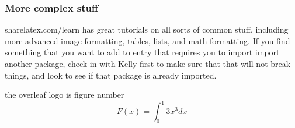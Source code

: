 \documentclass{article}
\begin{document}
\subsubsection{More complex stuff}
sharelatex.com/learn has great tutorials on all sorts of common stuff, including more advanced image formatting, tables, lists, and math formatting. If you find something that you want to add to entry that requires you to import import another package, check in with Kelly first to make sure that that will not break things, and look to see if that package is already imported.

the overleaf logo is figure number $$F(x) = \int_0^1 3x^3 dx$$ 
\end{document}
